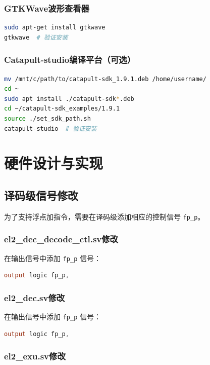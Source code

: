 \documentclass[12pt,a4paper]{article}
\begin{document}
\subsubsection{GTKWave波形查看器}
\begin{lstlisting}[language=bash]
sudo apt-get install gtkwave
gtkwave  # 验证安装
\end{lstlisting}

\subsubsection{Catapult-studio编译平台（可选）}
\begin{lstlisting}[language=bash]
mv /mnt/c/path/to/catapult-sdk_1.9.1.deb /home/username/
cd ~
sudo apt install ./catapult-sdk*.deb
cd ~/catapult-sdk_examples/1.9.1
source ./set_sdk_path.sh
catapult-studio  # 验证安装
\end{lstlisting}

\section{硬件设计与实现}

\subsection{译码级信号修改}

为了支持浮点加指令，需要在译码级添加相应的控制信号 \texttt{fp\_p}。

\subsubsection{el2\_dec\_decode\_ctl.sv修改}

在输出信号中添加 \texttt{fp\_p} 信号：
\begin{lstlisting}[language=Verilog]
output logic fp_p,
\end{lstlisting}

\subsubsection{el2\_dec.sv修改}

在输出信号中添加 \texttt{fp\_p} 信号：
\begin{lstlisting}[language=Verilog]
output logic fp_p,
\end{lstlisting}

\subsubsection{el2\_exu.sv修改}
\end{document}
